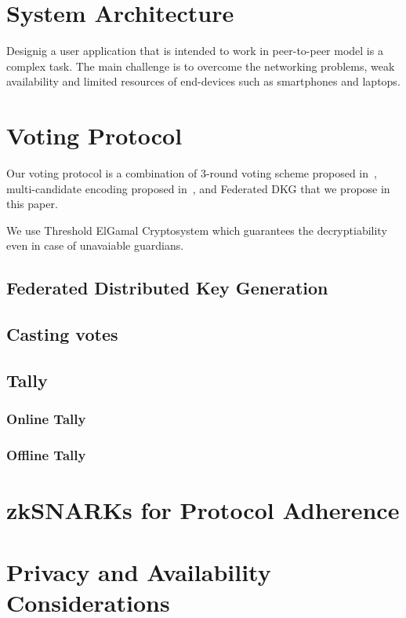 \documentclass{article}
\begin{document}
\section{System Architecture}
Designig a user application that is intended to work in peer-to-peer model is a complex task. The main challenge is to overcome the networking problems, weak availability and limited resources of end-devices such as smartphones and laptops.


\section{Voting Protocol}
Our voting protocol is a combination of 3-round voting scheme proposed in~\cite{schoenmakersLectureNotesCryptographic2018}, multi-candidate encoding proposed in~\cite{haoAnonymousVotingTworound2010}, and Federated DKG that we propose in this paper. 

We use Threshold ElGamal Cryptosystem which guarantees the decryptiability even in case of unavaiable guardians.


\subsection{Federated Distributed Key Generation}

\subsection{Casting votes}

\subsection{Tally}

\subsubsection{Online Tally}

\subsubsection{Offline Tally}

\section{zkSNARKs for Protocol Adherence}

\section{Privacy and Availability Considerations}
\end{document}
